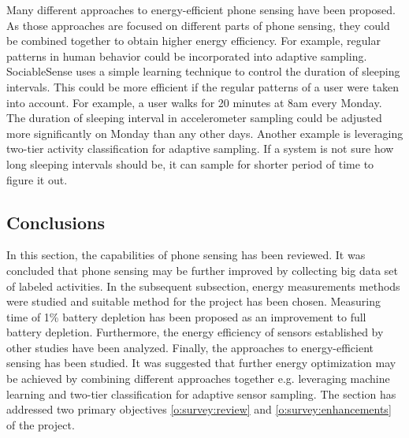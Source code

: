 Many different approaches to energy-efficient phone sensing have been proposed. As those approaches are focused on different parts of phone sensing, they could be combined together to obtain higher energy efficiency. For example, regular patterns in human behavior could be incorporated into adaptive sampling. SociableSense \cite{rachuri:socialsense} uses a simple learning technique to control the duration of sleeping intervals. This could be more efficient if the regular patterns of a user were taken into account. For example, a user walks for 20 minutes at 8am every Monday. The duration of sleeping interval in accelerometer sampling could be adjusted more significantly on Monday than any other days. Another example is leveraging two-tier activity classification for adaptive sampling. If a system is not sure how long sleeping intervals should be, it can sample for shorter period of time to figure it out. 

\subsection{Conclusions}
\hspace{10pt} In this section, the capabilities of phone sensing has been reviewed. It was concluded that phone sensing may be further improved by collecting big data set of labeled activities. In the subsequent subsection, energy measurements methods were studied and suitable method for the project has been chosen. Measuring time of 1\% battery depletion has been proposed as an improvement to full battery depletion. Furthermore, the energy efficiency of sensors established by other studies have been analyzed. Finally, the approaches to energy-efficient sensing has been studied. It was suggested that further energy optimization may be achieved by combining different approaches together e.g. leveraging machine learning and two-tier classification for adaptive sensor sampling. The section has addressed two primary objectives \ref{o:survey:review} and \ref{o:survey:enhancements} of the project.
